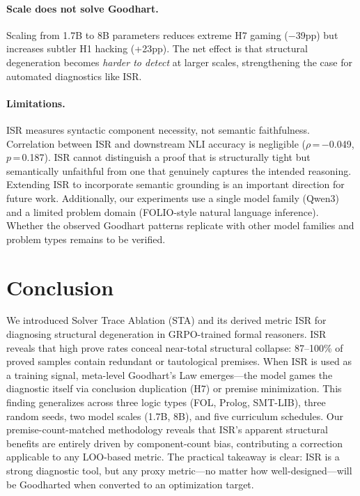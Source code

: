 \documentclass[11pt,a4paper]{article}
\begin{document}
\paragraph{Scale does not solve Goodhart.}
Scaling from 1.7B to 8B parameters reduces extreme H7 gaming ($-$39pp) but increases subtler H1 hacking (+23pp).
The net effect is that structural degeneration becomes \emph{harder to detect} at larger scales, strengthening the case for automated diagnostics like ISR.

\paragraph{Limitations.}
ISR measures syntactic component necessity, not semantic faithfulness.
Correlation between ISR and downstream NLI accuracy is negligible ($\rho$\,=\,$-$0.049, $p$\,=\,0.187).
ISR cannot distinguish a proof that is structurally tight but semantically unfaithful from one that genuinely captures the intended reasoning.
Extending ISR to incorporate semantic grounding is an important direction for future work.
Additionally, our experiments use a single model family (Qwen3) and a limited problem domain (FOLIO-style natural language inference).
Whether the observed Goodhart patterns replicate with other model families and problem types remains to be verified.

\section{Conclusion}
\label{sec:conclusion}

We introduced Solver Trace Ablation (STA) and its derived metric ISR for diagnosing structural degeneration in GRPO-trained formal reasoners.
ISR reveals that high prove rates conceal near-total structural collapse: 87--100\% of proved samples contain redundant or tautological premises.
When ISR is used as a training signal, meta-level Goodhart's Law emerges---the model games the diagnostic itself via conclusion duplication (H7) or premise minimization.
This finding generalizes across three logic types (FOL, Prolog, SMT-LIB), three random seeds, two model scales (1.7B, 8B), and five curriculum schedules.
Our premise-count-matched methodology reveals that ISR's apparent structural benefits are entirely driven by component-count bias, contributing a correction applicable to any LOO-based metric.
The practical takeaway is clear: ISR is a strong diagnostic tool, but any proxy metric---no matter how well-designed---will be Goodharted when converted to an optimization target.
\end{document}
